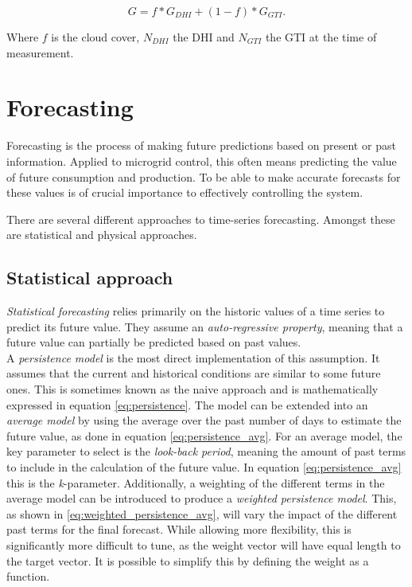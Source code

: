 \begin{equation}
    G = f*G_{DHI} + (1-f)*G_{GTI}
    \label{eq:irradiance}.
\end{equation}

Where $f$ is the cloud cover, $N_{DHI}$ the DHI and $N_{GTI}$ the GTI at the time of measurement. 

\section{Forecasting}
Forecasting is the process of making future predictions based on present or past information. Applied to microgrid control, this often means predicting the value of future consumption and production. To be able to make accurate forecasts for these values is of crucial importance to effectively controlling the system. 

There are several different approaches to time-series forecasting. Amongst these are statistical and physical approaches. 

\subsection{Statistical approach}\label{seq:stat_forecasting}

\textit{Statistical forecasting} relies primarily on the historic values of a time series to predict its future value. They assume an \textit{auto-regressive property}, meaning that a future value can partially be predicted based on past values.\\

A \textit{persistence model} is the most direct implementation of this assumption. It assumes that the current and historical conditions are similar  to some future ones. This is sometimes known as the naive approach and is mathematically expressed in equation \ref{eq:persistence}. The model can be  extended into an \textit{average model} by using the average over the past number of days to estimate the future value, as done in equation \ref{eq:persistence_avg}. For an average model, the key parameter to select is the \textit{look-back period}, meaning the amount of past terms to include in the calculation of the future value. In equation \ref{eq:persistence_avg} this is the \textit{k}-parameter. Additionally, a weighting of the different terms in the average model can be introduced to produce a \textit{weighted persistence model}. This, as shown in \ref{eq:weighted_persistence_avg}, will vary the impact of the different past terms for the final forecast. While allowing more flexibility, this is significantly more difficult to tune, as the weight vector will have equal length to the target vector. It is possible to simplify this by defining the weight as a function.    

